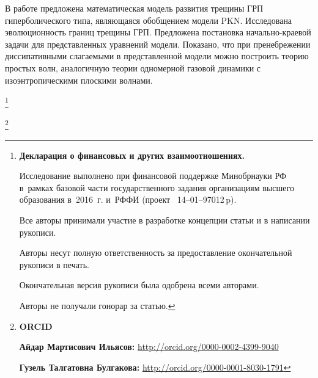 \smallskip




В работе предложена математическая модель развития трещины ГРП гиперболического типа, являющаяся обобщением модели PKN. Исследована эволюционность границ трещины ГРП. Предложена постановка начально-краевой задачи для представленных уравнений модели. Показано, что при пренебрежении диссипативными слагаемыми в представленной модели можно построить теорию простых волн, аналогичную теории одномерной газовой динамики с изоэнтропическими плоскими волнами.



\thanks{{\bf Декларация о финансовых и других взаимоотношениях.}

Исследование выполнено при финансовой поддержке Минобрнауки РФ в~рамках базовой части государственного задания организациям высшего образования в~2016~г. и~РФФИ (проект \No~14--01--97012\,p). 

Все  авторы  принимали  участие  в  разработке  концепции  \mbox{статьи}  и  в  написании  рукописи. 

Авторы несут  полную  ответственность  за  предоставление  окончательной рукописи в печать.

Окончательная  версия рукописи была одобрена всеми авторами.

Авторы не получали гонорар за статью.

}





\thanks{{\bf ORCID}



{\bf  Айдар Мартисович Ильясов:}    \url{http://orcid.org/0000-0002-4399-9040}



{\bf  Гузель Талгатовна Булгакова:} \url{http://orcid.org/0000-0001-8030-1791}



}







\RusRef

